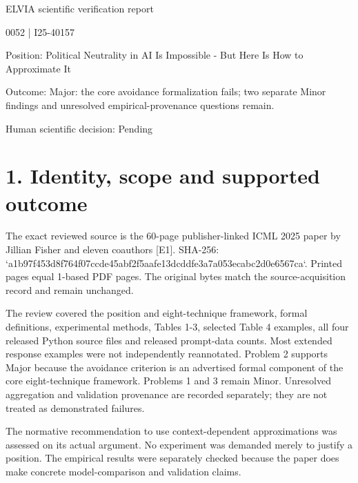 \documentclass[10pt]{article}
\begin{document}
ELVIA scientific verification report\par
0052 | I25-40157\par
Position: Political Neutrality in AI Is Impossible - But Here Is How to Approximate It\par
Outcome: Major: the core avoidance formalization fails; two separate Minor findings and unresolved empirical-provenance questions remain.\par
Human scientific decision: Pending\par
\section*{1. Identity, scope and supported outcome}
The exact reviewed source is the 60-page publisher-linked ICML 2025 paper by Jillian Fisher and eleven coauthors [E1]. SHA-256: `a1b97f453d8f764f07ccde45abf2f5aafe13dcddfe3a7a053ecabc2d0e6567ca`. Printed pages equal 1-based PDF pages. The original bytes match the source-acquisition record and remain unchanged.\par
The review covered the position and eight-technique framework, formal definitions, experimental methods, Tables 1-3, selected Table 4 examples, all four released Python source files and released prompt-data counts. Most extended response examples were not independently reannotated. Problem 2 supports Major because the avoidance criterion is an advertised formal component of the core eight-technique framework. Problems 1 and 3 remain Minor. Unresolved aggregation and validation provenance are recorded separately; they are not treated as demonstrated failures.\par
The normative recommendation to use context-dependent approximations was assessed on its actual argument. No experiment was demanded merely to justify a position. The empirical results were separately checked because the paper does make concrete model-comparison and validation claims.\par
\end{document}
